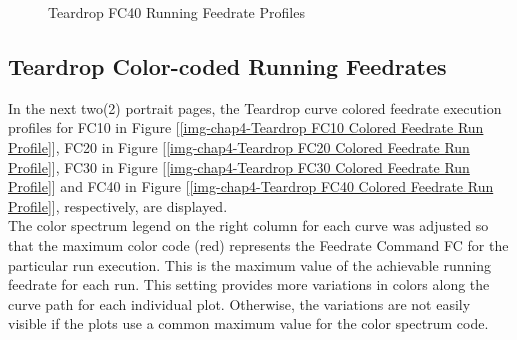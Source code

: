 \begin{figure}
	\caption  {Teardrop FC40 Running Feedrate Profiles}
	\label{img-chap4-Teardrop-FC40-Running-Feedrate-Profiles.pdf}
\end{figure}	


\clearpage
\pagebreak

\subsection{Teardrop Color-coded Running Feedrates}
\label{ssec-chap4-Teardrop FC10 FC20 FC30 FC40 Colored Feedrate Run Profile}

In the next two(2) portrait pages, the Teardrop curve colored feedrate execution profiles for 
FC10 in Figure [\ref{img-chap4-Teardrop FC10 Colored Feedrate Run Profile}], 
FC20 in Figure [\ref{img-chap4-Teardrop FC20 Colored Feedrate Run Profile}], 
FC30 in Figure [\ref{img-chap4-Teardrop FC30 Colored Feedrate Run Profile}] and 
FC40 in Figure [\ref{img-chap4-Teardrop FC40 Colored Feedrate Run Profile}], 
respectively, are displayed. \\

The color spectrum legend on the right column for each curve was adjusted so that the maximum color code (red) represents the Feedrate Command FC for the particular run execution. This is the maximum value of the achievable running feedrate for each run. This setting provides more variations in colors along the curve path for each individual plot. Otherwise, the variations are not easily visible if the plots use a common maximum value for the color spectrum code.\\ 

